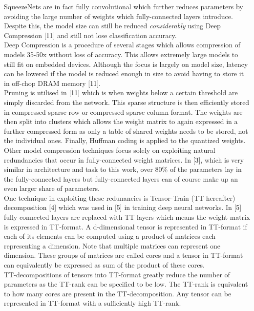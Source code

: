 \documentclass{article}
\begin{document}
SqueezeNets are in fact fully convolutional which further reduces parameters by avoiding the large number of weights which fully-connected layers introduce. Despite this, the model size can still be reduced \emph{considerably} using Deep Compression  [11] and still not lose classification accuracy.\\

Deep Compression is a procedure of several stages which allows compression of models 35-50x without loss of accuracy. This allows extremely large models to still fit on embedded devices. Although the focus is largely on model size, latency can be lowered if the model is reduced enough in size to avoid having to store it in off-chop DRAM memory [11].\\

Pruning is utilised in [11] which is when weights below a certain threshold are simply discarded from the network. This sparse structure is then efficiently stored in compressed sparse row or compressed sparse column format. The weights are then split into clusters which allows the weight matrix to again expressed in a further compressed form as only a table of shared weights needs to be stored, not the individual ones. Finally, Huffman coding is applied to the quantized weights.\\

Other model compression techniques focus solely on exploiting natural redundancies that occur in fully-connected weight matrices. In [3], which is very similar in architecture and task to this work, over 80\% of the parameters lay in the fully-connected layers but fully-connected layers can of course make up an even larger share of parameters.\\

One technique in exploiting these redunancies is Tensor-Train (TT hereafter) decomposition [4] which was used in [5] in training deep neural networks. In [5] fully-connected layers are replaced with TT-layers which means the weight matrix is expressed in TT-format. A d-dimensional tensor is represented in TT-format if each of its elements can be computed using a product of matrices each representing a dimension. Note that multiple matrices can represent one dimension. These groups of matrices are called cores and a tensor in TT-format can equivalently be expressed as sum of the product of these cores. \\

TT-decompositions of tensors into TT-format greatly reduce the number of parameters as the TT-rank can be specified to be low. The TT-rank is equivalent to how many cores are present in the TT-decomposition. Any tensor can be represented in TT-format with a sufficiently high TT-rank.\\
\end{document}
